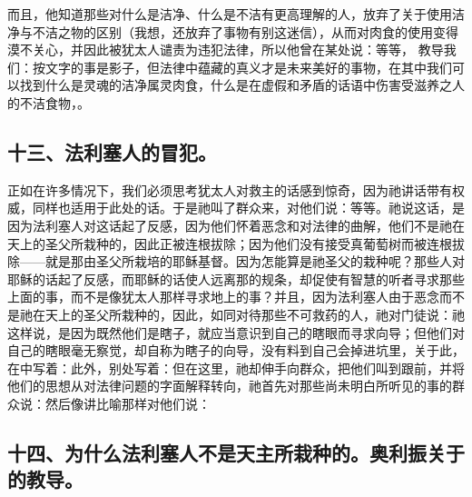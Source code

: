 而且，他知道那些对什么是洁净、什么是不洁有更高理解的人，放弃了关于使用洁净与不洁之物的区别（我想，还放弃了事物有别这迷信），从而对肉食的使用变得漠不关心，并因此被犹太人谴责为违犯法律，所以他曾在某处说：等等， 教导我们：按文字的事是影子，但法律中蕴藏的真义才是未来美好的事物，在其中我们可以找到什么是灵魂的洁净属灵肉食，什么是在虚假和矛盾的话语中伤害受滋养之人的不洁食物，。\par


\subsection{十三、法利塞人的冒犯。}

正如在许多情况下，我们必须思考犹太人对救主的话感到惊奇，因为祂讲话带有权威，同样也适用于此处的话。于是祂叫了群众来，对他们说：等等。祂说这话，是因为法利塞人对这话起了反感，因为他们怀着恶念和对法律的曲解，他们不是祂在天上的圣父所栽种的，因此正被连根拔除；因为他们没有接受真葡萄树而被连根拔除——就是那由圣父所栽培的耶稣基督。因为怎能算是祂圣父的栽种呢？那些人对耶稣的话起了反感，而耶稣的话使人远离那的规条，却促使有智慧的听者寻求那些上面的事，而不是像犹太人那样寻求地上的事？并且，因为法利塞人由于恶念而不是祂在天上的圣父所栽种的，因此，如同对待那些不可救药的人，祂对门徒说：祂这样说，是因为既然他们是瞎子，就应当意识到自己的瞎眼而寻求向导；但他们对自己的瞎眼毫无察觉，却自称为瞎子的向导，没有料到自己会掉进坑里，关于此，在中写着：此外，别处写着：但在这里，祂却伸手向群众，把他们叫到跟前，并将他们的思想从对法律问题的字面解释转向，祂首先对那些尚未明白所听见的事的群众说：然后像讲比喻那样对他们说：\par


\subsection{十四、为什么法利塞人不是天主所栽种的。奥利振关于的教导。}

